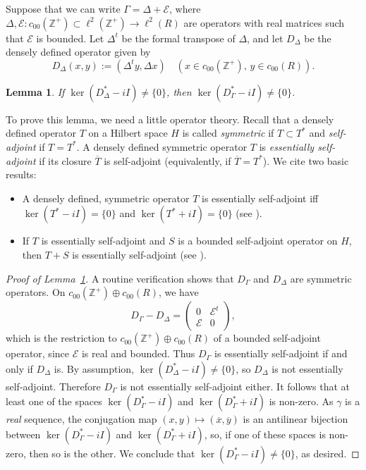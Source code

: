 \documentclass[11pt,reqno]{amsart}
\theoremstyle{plain}
\newtheorem{lemma}[theorem]{Lemma}
\theoremstyle{definition}
\theoremstyle{remark}
\newcommand{\cE}{\mathcal{E}}
\newcommand{\ZZ}{\mathbb{Z}}
\begin{document}
Suppose that we can write $\Gamma=\Delta+\cE$,
where $\Delta,\cE:c_{00}(\ZZ^+)\subset\ell^2(\ZZ^+)\to \ell^2(R)$ are operators with real matrices such that
$\cE$ is bounded. 
Let $\Delta^t$ be the formal transpose of $\Delta$, and let $D_\Delta$ be the densely defined operator given by
\[
D_\Delta(x,y):=(\Delta^t y,\Delta x)\quad(x\in c_{00}(\ZZ^+),\, y\in c_{00}(R)).
\]

\begin{lemma}\label{L:perturb}
If $\ker(D_\Delta^*-iI)\ne\{0\}$,
then $\ker(D_\Gamma^*-iI)\ne\{0\}$.
\end{lemma}

To prove this lemma, we need a little operator theory.
Recall that a densely defined operator  $T$ on a Hilbert space $H$
is called \emph{symmetric} if $T\subset T^*$ and \emph{self-adjoint} if $T=T^*$. A densely defined symmetric operator $T$ is \emph{essentially self-adjoint} if its closure $\overline{T}$ is self-adjoint 
(equivalently, if $\overline{T}=T^*$).
We cite two basic results:
\begin{itemize} 
\item A densely defined, symmetric operator $T$ is essentially self-adjoint iff $\ker(T^*-iI)=\{0\}$ and $\ker(T^*+iI)=\{0\}$ (see \cite[Corollary~2.8]{Te14}).
\item If $T$ is essentially self-adjoint and $S$ is a bounded self-adjoint operator on $H$, then $T+S$ is essentially self-adjoint
(see \cite[Theorem~6.4]{Te14}).
\end{itemize}

\begin{proof}[Proof of Lemma~\ref{L:perturb}]
A  routine verification shows that $D_\Gamma$ and $D_\Delta$ are symmetric operators.
On $c_{00}(\ZZ^+)\oplus c_{00}(R)$, we have
\[
D_\Gamma-D_\Delta=
\begin{pmatrix}
0 &\cE^t\\\cE &0
\end{pmatrix},
\]
which is the restriction to 
$c_{00}(\ZZ^+)\oplus c_{00}(R)$
of a bounded self-adjoint operator,
since $\cE$ is real and bounded.
Thus $D_\Gamma$ is essentially self-adjoint if and only if $D_\Delta$ is.
By assumption, $\ker(D_\Delta^*-iI)\ne\{0\}$, so $D_\Delta$ is not essentially self-adjoint. 
Therefore $D_\Gamma$ is not essentially self-adjoint either. 
It follows that at least one of the spaces
$\ker(D_\Gamma^*-iI)$ and $\ker(D_\Gamma^*+iI)$ is non-zero.
As $\gamma$ is a \emph{real} sequence, the conjugation map $(x,y)\mapsto(\overline{x},\overline{y})$ is an antilinear bijection  between $\ker(D_\Gamma^*-iI)$ and $\ker(D_\Gamma^*+iI)$, so, if one of these spaces is
non-zero, then so is the other. We conclude that $\ker(D_\Gamma^*-iI)\ne\{0\}$, as desired.
\end{proof}
\end{document}
